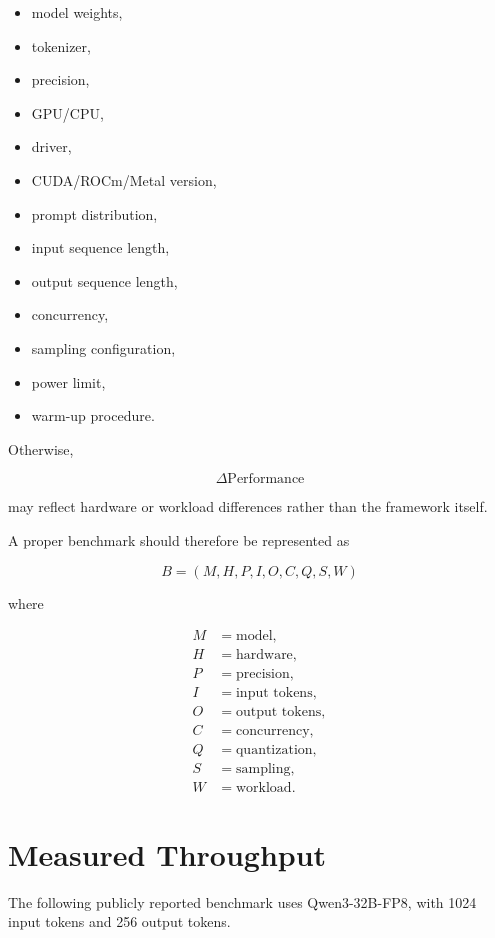 \documentclass[11pt,a4paper]{article}
\begin{document}
\begin{itemize}
    \item model weights,
    \item tokenizer,
    \item precision,
    \item GPU/CPU,
    \item driver,
    \item CUDA/ROCm/Metal version,
    \item prompt distribution,
    \item input sequence length,
    \item output sequence length,
    \item concurrency,
    \item sampling configuration,
    \item power limit,
    \item warm-up procedure.
\end{itemize}

Otherwise,

\[
\Delta \mathrm{Performance}
\]

may reflect hardware or workload differences rather than the
framework itself.

A proper benchmark should therefore be represented as

\[
B =
(
M,H,P,I,O,C,Q,S,W
)
\]

where

\begin{align}
M &= \text{model},\\
H &= \text{hardware},\\
P &= \text{precision},\\
I &= \text{input tokens},\\
O &= \text{output tokens},\\
C &= \text{concurrency},\\
Q &= \text{quantization},\\
S &= \text{sampling},\\
W &= \text{workload}.
\end{align}

\section{Measured Throughput}

The following publicly reported benchmark uses Qwen3-32B-FP8,
with 1024 input tokens and 256 output tokens.
\end{document}
